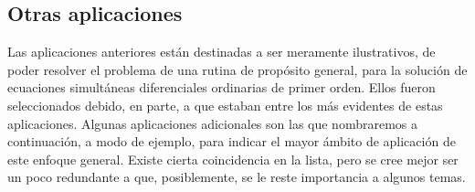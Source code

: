 \subsection{Otras aplicaciones}

Las aplicaciones anteriores están destinadas a ser meramente ilustrativos, de poder resolver
el problema de una rutina de propósito general, para la solución de ecuaciones simultáneas
diferenciales ordinarias de primer orden. Ellos fueron seleccionados debido,
en parte, a que estaban entre los más evidentes de estas aplicaciones. Algunas
aplicaciones adicionales son las que nombraremos a continuación,
a modo de ejemplo, para indicar el mayor ámbito de aplicación de este enfoque general.
Existe cierta coincidencia en la lista, pero se cree mejor ser un poco
redundante a que, posiblemente, se le reste importancia a algunos temas.

